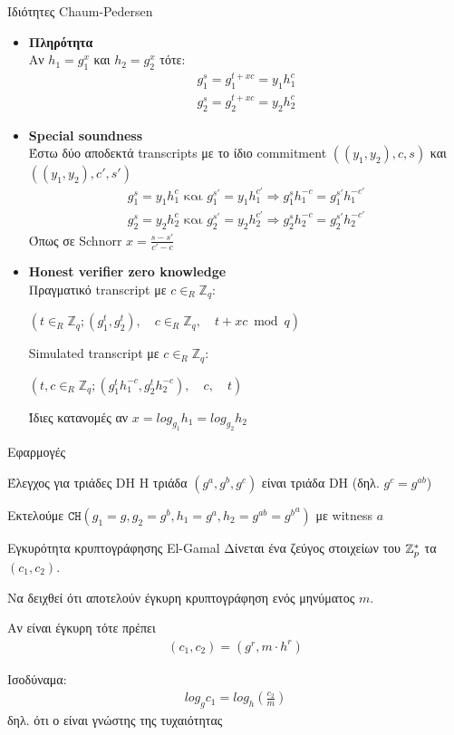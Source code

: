 \documentclass[handout]{beamer}
\begin{document}
\begin{frame}[allowframebreaks]{Ιδιότητες Chaum-Pedersen}
\begin{itemize}
\item \textbf{Πληρότητα}\\
Αν $h_1 = g_1^x$ και $h_2 = g_2^x$ τότε:
\begin{align*}
g_1^s = g_1^{t+xc} = y_1h_1^c \\
g_2^s = g_2^{t+xc} = y_2h_2^c
\end{align*}
\item \textbf{Special soundness}\\
Έστω δύο αποδεκτά transcripts με το ίδιο commitment $((y_1,y_2),c,s)$ και $((y_1,y_2),c',s')$
\begin{align*}
g_1^s =  y_1h_1^c \text{  και  } g_1^{s'} =  y_1h_1^{c'} \Rightarrow g_1^s h_1^{-c} = g_1^{s'} h_1^{-c'} \\
g_2^s =  y_2h_2^c \text{  και  } g_2^{s'} =  y_2h_2^{c'} \Rightarrow g_2^s h_2^{-c} = g_2^{s'} h_2^{-c'}
\end{align*}
Όπως σε Schnorr $x = \frac{s-s'}{c'-c}$
\framebreak
\item \textbf{Honest verifier zero knowledge}\\
Πραγματικό transcript με $c \in_R \mathbb{Z}_q$: 
\begin{center}
$(t \in_R \mathbb{Z}_q;(g_1^t,g_2^t), \quad c \in_R \mathbb{Z}_q,\quad t+xc \bmod{q})$
\end{center}
Simulated transcript με $c \in_R \mathbb{Z}_q$: 
\begin{center}
$(t,c \in_R \mathbb{Z}_q;(g_1^t h_1^{-c},g_2^th_2^{-c}), \quad c, \quad t)$
\end{center}
Ίδιες κατανομές αν $x=log_{g_1}{h_1}=log_{g_2}{h_2}$
\end{itemize}
\end{frame}

\begin{frame}{Εφαρμογές}
\begin{small}
\begin{block}{Έλεγχος για τριάδες DH}
Η τριάδα $(g^a,g^b,g^c)$ είναι τριάδα DH (δηλ. $g^c = g^{ab}$) 
\end{block}
\pause
Εκτελούμε $\mathtt{CH}(g_1 = g,g_2 = g^b,h_1 = g^a, h_2 = g^{ab} = {g^b}^a)$ με witness $a$
\begin{block}{Εγκυρότητα κρυπτογράφησης El-Gamal}
Δίνεται ένα ζεύγος στοιχείων του $\mathbb{Z}^*_{p}$ τα $(c_1,c_2)$. 

Να δειχθεί ότι αποτελούν έγκυρη κρυπτογράφηση ενός μηνύματος $m$.
\end{block}
\pause
Αν είναι έγκυρη τότε πρέπει
\begin{align*}
(c_1,c_2) = (g^r, m \cdot h^r)
\end{align*}

Ισοδύναμα: 
\begin{align*}
log_g c_1 = log_h (\frac{c_2}{m}) 
\end{align*}
δηλ. ότι ο \prv είναι γνώστης της τυχαιότητας
\end{small} 
\end{frame}
\end{document}
